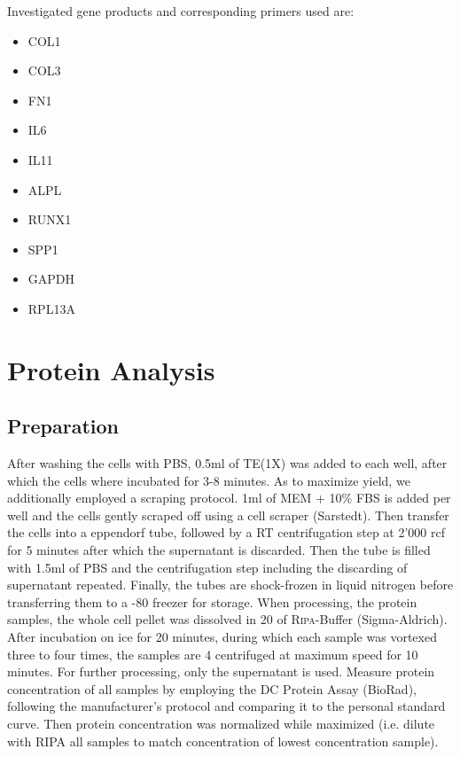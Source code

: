 Investigated gene products and corresponding primers used are: 
\begin{itemize}
\item COL1
\item COL3
\item FN1
\item IL6
\item IL11
\item ALPL
\item RUNX1
\item SPP1
\item GAPDH 
\item RPL13A
\end{itemize}

\section{Protein Analysis}
\subsection{Preparation}
After washing the cells with PBS, 0.5ml of TE(1X) was added to each well, after which the cells where incubated for 3-8 minutes. As to maximize yield, we additionally employed a scraping protocol. 1ml of MEM\textalpha{} + 10\% FBS is added per well and the cells gently scraped off using a cell scraper (Sarstedt). Then transfer the cells into a eppendorf tube, followed by a RT centrifugation step at 2'000 rcf for 5 minutes after which the supernatant is discarded. Then the tube is filled with 1.5ml of PBS and the centrifugation step including the discarding of supernatant repeated. Finally, the tubes are shock-frozen in liquid nitrogen before transferring them to a -80 \degC freezer for storage. When processing, the protein samples, the whole cell pellet was dissolved in 20\mul{} of \textsc{Ripa}-Buffer (Sigma-Aldrich). After incubation on ice for 20 minutes, during which each sample was vortexed three to four times, the samples are 4 \degC centrifuged at maximum speed for 10 minutes. For further processing, only the supernatant is used. Measure protein concentration of all samples by employing the DC\texttrademark{} Protein Assay (BioRad), following the manufacturer's protocol and comparing it to the personal standard curve. Then protein concentration was normalized while maximized (i.e. dilute with RIPA all samples to match concentration of lowest concentration sample). 

